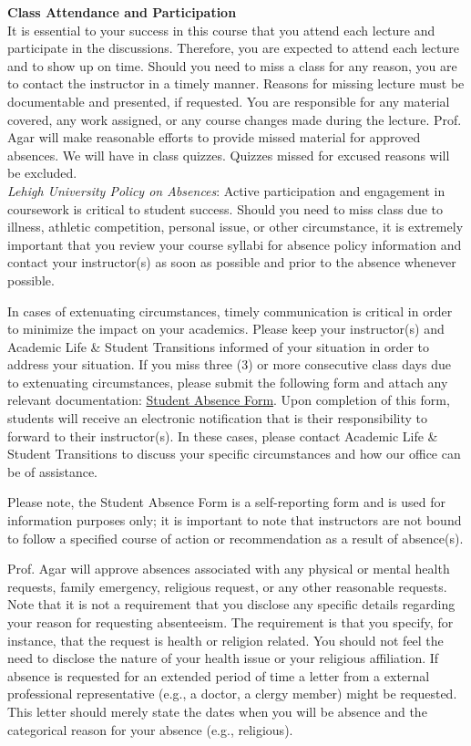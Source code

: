 \documentclass[11pt,letterpaper]{article}
\newcommand{\lefthead}[2]{\noindent\textbf{#1}\hfill\\[#2]}
\begin{document}
\lefthead{Class Attendance and Participation}{0.3cm}
 It is essential to your success in this course that you attend each lecture and participate in the discussions. Therefore, you are expected to attend each lecture and to show up on time. Should you need to miss a class for any reason, you are to contact the instructor in a timely manner. Reasons for missing lecture must be documentable and presented, if requested. You are responsible for any material covered, any work assigned, or any course changes made during the lecture. Prof. Agar will make reasonable efforts to provide missed material for approved absences. We will have in class quizzes. Quizzes missed for excused reasons will be excluded. \\

\noindent \emph{Lehigh University Policy on Absences}: Active participation and engagement in coursework is critical to student success. Should you need to miss class due to illness, athletic competition, personal issue, or other circumstance, it is extremely important that you review your course syllabi for absence policy information and contact your instructor(s) as soon as possible and prior to the absence whenever possible.

In cases of extenuating circumstances, timely communication is critical in order to minimize the impact on your academics. Please keep your instructor(s) and Academic Life & Student Transitions informed of your situation in order to address your situation. If you miss three (3) or more consecutive class days due to extenuating circumstances, please submit the following form and attach any relevant documentation: \href{http://www.lehigh.edu/go/absenceform}{Student Absence Form}. Upon completion of this form, students will receive an electronic notification that is their responsibility to forward to their instructor(s). In these cases, please contact Academic Life & Student Transitions to discuss your specific circumstances and how our office can be of assistance.

Please note, the Student Absence Form is a self-reporting form and is used for information purposes only; it is important to note that instructors are not bound to follow a specified course of action or recommendation as a result of absence(s). 

Prof. Agar will approve absences associated with any physical or mental health requests, family emergency, religious request, or any other reasonable requests. Note that it is not a requirement that you disclose any specific details regarding your reason for requesting absenteeism. The requirement is that you specify, for instance, that the request is health or religion related. You should not feel the need to disclose the nature of your health issue or your religious affiliation. If absence is requested for an extended period of time a letter from a external professional representative (e.g., a doctor, a clergy member) might be requested. This letter should merely state the dates when you will be absence and the categorical reason for your absence (e.g., religious).      
\end{document}
